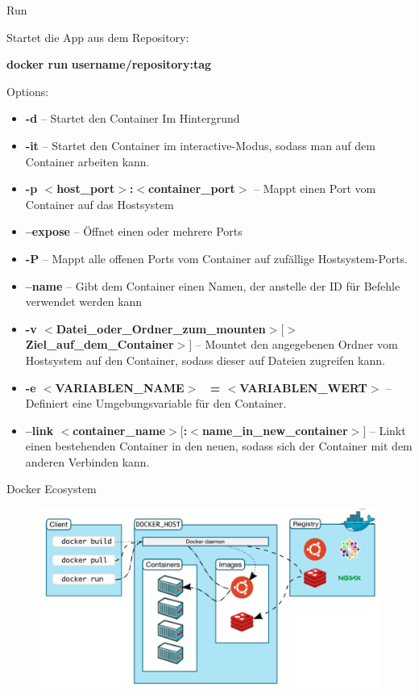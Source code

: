 \documentclass[final]{beamer}
\newlength{\specialcolwid}
\begin{document}
\begin{frame}
\begin{columns}[t]
\begin{column}{\specialcolwid}
\begin{block}{Run}
\par Startet die App aus dem Repository:
\par \textbf{docker run} \textcolor{docker-pu}{} \textcolor{docker-lb}{\textbf{username/repository:tag}}
\vspace{1cm}

\par Options:
\begin{itemize}
\item \textbf{-d} -- Startet den Container Im Hintergrund
\item \textbf{-it} -- Startet den Container im interactive-Modus, sodass man auf dem Container arbeiten kann.
\item \textbf{-p $<$host\_port$>$:$<$container\_port$>$} -- Mappt einen Port vom Container auf das Hostsystem
\item \textbf{--expose} -- Öffnet einen oder mehrere Ports
\item \textbf{-P} -- Mappt alle offenen Ports vom Container auf zufällige Hostsystem-Ports.
\item \textbf{--name} -- Gibt dem Container einen Namen, der anstelle der ID für Befehle verwendet werden kann
\item \textbf{-v $<$Datei\_oder\_Ordner\_zum\_mounten$>[$\:$>$Ziel\_auf\_dem\_Container$>]$} -- Mountet den angegebenen Ordner vom Hostsystem auf den Container, sodass dieser auf Dateien zugreifen kann.
\item \textbf{-e $<$VARIABLEN\_NAME$>$ \ = $<$VARIABLEN\_WERT$>$} -- Definiert eine Umgebungsvariable für den Container.
\item \textbf{--link $<$container\_name$>[$:$<$name\_in\_new\_container$>]$} --  Linkt einen bestehenden Container in den neuen, sodass sich der Container mit dem anderen Verbinden kann.
\end{itemize}


\begin{center}
\vspace{2cm}
Docker Ecosystem
\end{center}
\begin{figure}
\includegraphics[scale=0.75]{eco}
\end{figure}


\end{block}
\end{column}
\end{columns}
\end{frame}
\end{document}
